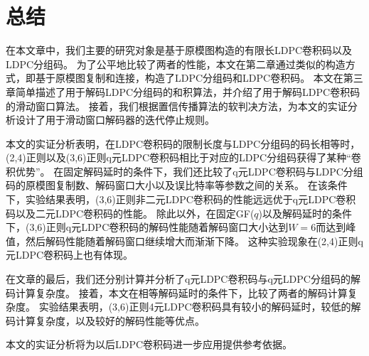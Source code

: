 \chapter{总结}
在本文章中，我们主要的研究对象是基于原模图构造的有限长LDPC卷积码以及LDPC分组码。
为了公平地比较了两者的性能，本文在第二章通过类似的构造方式，即基于原模图复制和连接，构造了LDPC分组码和LDPC卷积码。
本文在第三章简单描述了用于解码LDPC分组码的和积算法，并介绍了用于解码LDPC卷积码的滑动窗口算法。
接着，我们根据置信传播算法的软判决方法，为本文的实证分析设计了用于滑动窗口解码器的迭代停止规则。

本文的实证分析表明，在LDPC卷积码的限制长度与LDPC分组码的码长相等时，(2,4)正则以及(3,6)正则q元LDPC卷积码相比于对应的LDPC分组码获得了某种“卷积优势”。
在固定解码延时的条件下，我们还比较了q元LDPC卷积码与LDPC分组码的原模图复制数、解码窗口大小以及误比特率等参数之间的关系。
在该条件下，实验结果表明，(3,6)正则非二元LDPC卷积码的性能远远优于q元LDPC卷积码以及二元LDPC卷积码的性能。
除此以外，在固定GF($q$)以及解码延时的条件下，(3,6)正则q元LDPC卷积码的解码性能随着解码窗口大小达到$W=6$而达到峰值，然后解码性能随着解码窗口继续增大而渐渐下降。
这种实验现象在(2,4)正则q元LDPC卷积码上也有体现。

在文章的最后，我们还分别计算并分析了q元LDPC卷积码与q元LDPC分组码的解码计算复杂度。
接着，本文在相等解码延时的条件下，比较了两者的解码计算复杂度。
实验结果表明，(3,6)正则4元LDPC卷积码具有较小的解码延时，较低的解码计算复杂度，以及较好的解码性能等优点。

本文的实证分析将为以后LDPC卷积码进一步应用提供参考依据。


















